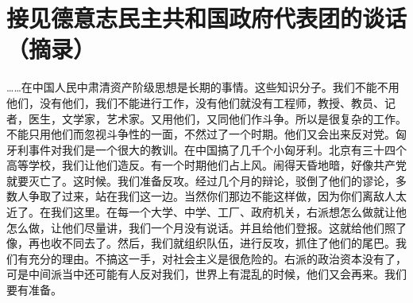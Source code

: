 \section[接见德意志民主共和国政府代表团的谈话（摘录）（一九五九年一月二十七日）]{接见德意志民主共和国政府代表团的谈话（摘录）}


……在中国人民中肃清资产阶级思想是长期的事情。这些知识分子。我们不能不用他们，没有他们，我们不能进行工作，没有他们就没有工程师，教授、教员、记者，医生，文学家，艺术家。又用他们，又同他们作斗争。所以是很复杂的工作。不能只用他们而忽视斗争性的一面，不然过了一个时期。他们又会出来反对党。匈牙利事件对我们是一个很大的教训。在中国搞了几千个小匈牙利。北京有三十四个高等学校，我们让他们造反。有一个时期他们占上风。闹得天昏地暗，好像共产党就要灭亡了。这时候。我们准备反攻。经过几个月的辩论，驳倒了他们的谬论，多数人争取了过来，站在我们这一边。当然你们那边不能这样做，因为你们离敌人太近了。在我们这里。在每一个大学、中学、工厂、政府机关，右派想怎么做就让他怎么做，让他们尽量讲，我们一个月没有说话。并且给他们登报。这就给他们照了像，再也收不同去了。然后，我们就组织队伍，进行反攻，抓住了他们的尾巴。我们有充分的理由。不搞这一手，对社会主义是很危险的。右派的政治资本没有了，可是中间派当中还可能有人反对我们，世界上有混乱的时候，他们又会再来。我们要有准备。


